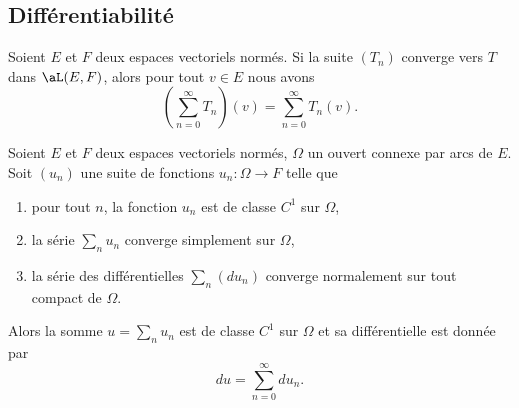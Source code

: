 \subsection{Différentiabilité}

\begin{lemma}
    Soient \( E\) et \( F\) deux espaces vectoriels normés. Si la suite \( (T_n)\) converge vers \( T\) dans \( \aL(E,F)\), alors pour tout \( v\in E\) nous avons
    \begin{equation}
        \left( \sum_{n=0}^{\infty}T_n \right)(v)=\sum_{n=0}^{\infty}T_n(v).
    \end{equation}
\end{lemma}

\begin{theorem} \label{ThoLDpRmXQ}
    Soient \( E\) et \( F\) deux espaces vectoriels normés, \( \Omega\) un ouvert connexe par arcs de \( E\). Soit \( (u_n)\) une suite de fonctions \( u_n\colon \Omega\to F\) telle que
    \begin{enumerate}
        \item
            pour tout \( n\), la fonction \( u_n\) est de classe \( C^1\) sur \( \Omega\),
        \item
            la série \( \sum_nu_n\) converge simplement sur \( \Omega\),
        \item
            la série des différentielles \( \sum_n(du_n)\) converge normalement sur tout compact de \( \Omega\).
    \end{enumerate}
    Alors la somme \( u=\sum_nu_n\) est de classe \( C^1\) sur \( \Omega\) et sa différentielle est donnée par
    \begin{equation}
        du=\sum_{n=0}^{\infty}du_n.
    \end{equation}
\end{theorem}

